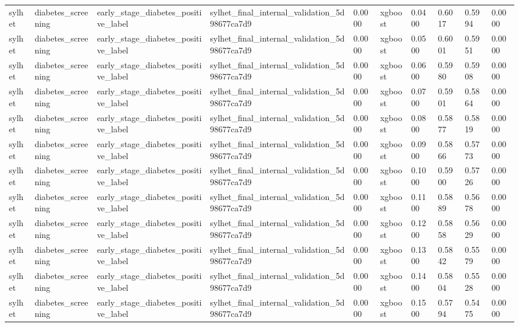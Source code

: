 \begin{tabular}{llllllllll}
sylhet & diabetes\_screening & early\_stage\_diabetes\_positive\_label & sylhet\_final\_internal\_validation\_5d98677ca7d9 & 0.0000 & xgboost & 0.0400 & 0.6017 & 0.5994 & 0.0000 \\
sylhet & diabetes\_screening & early\_stage\_diabetes\_positive\_label & sylhet\_final\_internal\_validation\_5d98677ca7d9 & 0.0000 & xgboost & 0.0500 & 0.6001 & 0.5951 & 0.0000 \\
sylhet & diabetes\_screening & early\_stage\_diabetes\_positive\_label & sylhet\_final\_internal\_validation\_5d98677ca7d9 & 0.0000 & xgboost & 0.0600 & 0.5980 & 0.5908 & 0.0000 \\
sylhet & diabetes\_screening & early\_stage\_diabetes\_positive\_label & sylhet\_final\_internal\_validation\_5d98677ca7d9 & 0.0000 & xgboost & 0.0700 & 0.5901 & 0.5864 & 0.0000 \\
sylhet & diabetes\_screening & early\_stage\_diabetes\_positive\_label & sylhet\_final\_internal\_validation\_5d98677ca7d9 & 0.0000 & xgboost & 0.0800 & 0.5877 & 0.5819 & 0.0000 \\
sylhet & diabetes\_screening & early\_stage\_diabetes\_positive\_label & sylhet\_final\_internal\_validation\_5d98677ca7d9 & 0.0000 & xgboost & 0.0900 & 0.5866 & 0.5773 & 0.0000 \\
sylhet & diabetes\_screening & early\_stage\_diabetes\_positive\_label & sylhet\_final\_internal\_validation\_5d98677ca7d9 & 0.0000 & xgboost & 0.1000 & 0.5900 & 0.5726 & 0.0000 \\
sylhet & diabetes\_screening & early\_stage\_diabetes\_positive\_label & sylhet\_final\_internal\_validation\_5d98677ca7d9 & 0.0000 & xgboost & 0.1100 & 0.5889 & 0.5678 & 0.0000 \\
sylhet & diabetes\_screening & early\_stage\_diabetes\_positive\_label & sylhet\_final\_internal\_validation\_5d98677ca7d9 & 0.0000 & xgboost & 0.1200 & 0.5858 & 0.5629 & 0.0000 \\
sylhet & diabetes\_screening & early\_stage\_diabetes\_positive\_label & sylhet\_final\_internal\_validation\_5d98677ca7d9 & 0.0000 & xgboost & 0.1300 & 0.5842 & 0.5579 & 0.0000 \\
sylhet & diabetes\_screening & early\_stage\_diabetes\_positive\_label & sylhet\_final\_internal\_validation\_5d98677ca7d9 & 0.0000 & xgboost & 0.1400 & 0.5804 & 0.5528 & 0.0000 \\
sylhet & diabetes\_screening & early\_stage\_diabetes\_positive\_label & sylhet\_final\_internal\_validation\_5d98677ca7d9 & 0.0000 & xgboost & 0.1500 & 0.5794 & 0.5475 & 0.0000 \\

\end{tabular}
